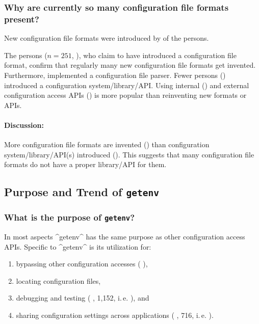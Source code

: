 \subsubsection{Why are currently so many configuration file formats present?}

\begin{finding}
New configuration file formats were introduced by  of the persons.
\end{finding}

\label{res:invented-configuration-file-format}
\methodQuestion{}
The  persons ($n=251$, ), who claim to have introduced a configuration file format, confirm that regularly many new configuration file formats get invented.
Furthermore,  implemented a configuration file parser.
Fewer persons () introduced a configuration system/library/API.
Using internal () and external configuration access APIs () is more popular than reinventing new formats or APIs.

\paragraph{Discussion:}
More configuration file formats are invented () than configuration system/library/API(s) introduced ().
This suggests that many configuration file formats do not have a proper library/API for them.







\subsection{Purpose and Trend of \texttt{getenv}}

\subsubsection{What is the purpose of \texttt{getenv}?}

\begin{finding}
\label{fnd:getenv-configuration}
In most aspects ^getenv^ has the same purpose as other configuration access APIs.
Specific to ^getenv^ is its utilization for:
\begin{enumerate}
\item bypassing other configuration accesses (\methodQuestion{} ),
\item locating configuration files,
\item debugging and testing (\methodQuestion{} , \methodSource{} 1,152, i.\,e. ), and
\item sharing configuration settings across applications (\methodQuestion{} , \methodSource{} 716, i.\,e. ).
\end{enumerate}
\end{finding}

